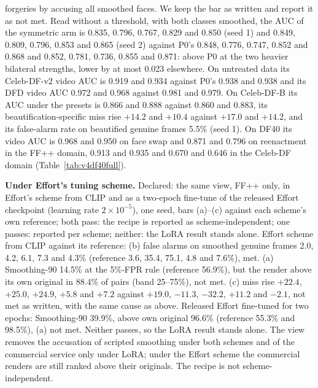 \documentclass[10pt]{article}
\begin{document}
forgeries by accusing all smoothed faces. We keep the bar as written and report it as not met. Read without a
threshold, with both classes smoothed, the AUC of the symmetric arm is 0.835, 0.796, 0.767, 0.829 and 0.850 (seed 1) and
0.849, 0.809, 0.796, 0.853 and 0.865 (seed 2) against P0's 0.848, 0.776, 0.747, 0.852 and 0.868 and 0.852, 0.781, 0.736,
0.855 and 0.871: above P0 at the two heavier bilateral strengths, lower by at most 0.023 elsewhere. On untreated data
its Celeb-DF-v2 video AUC is 0.919 and 0.934 against P0's 0.938 and 0.938 and its DFD video AUC 0.972 and 0.968 against
0.981 and 0.979. On Celeb-DF-B its AUC under the presets is 0.866 and 0.888 against 0.860 and 0.883, its
beautification-specific miss rise $+14.2$ and $+10.4$ against $+17.0$ and $+14.2$, and its false-alarm rate on
beautified genuine frames 5.5\% (seed 1). On DF40 its video AUC is 0.968 and 0.950 on face swap and 0.871 and 0.796 on
reenactment in the FF++ domain, 0.913 and 0.935 and 0.670 and 0.646 in the Celeb-DF domain
(Table~\ref{tab:v4df40full}).

\textbf{Under Effort's tuning scheme.} Declared: the same view, FF++ only, in Effort's scheme from CLIP and as a
two-epoch fine-tune of the released Effort checkpoint (learning rate $2\times10^{-5}$), one seed, bars (a)--(c) against
each scheme's own reference; both pass: the recipe is reported as scheme-independent; one passes: reported per scheme;
neither: the LoRA result stands alone. Effort scheme from CLIP against its reference: (b) false alarms on smoothed
genuine frames 2.0, 4.2, 6.1, 7.3 and 4.3\% (reference 3.6, 35.4, 75.1, 4.8 and 7.6\%), met. (a) Smoothing-90 14.5\% at
the 5\%-FPR rule (reference 56.9\%), but the render above its own original in 88.4\% of pairs (band 25--75\%), not met.
(c) miss rise $+22.4$, $+25.0$, $+24.9$, $+5.8$ and $+7.2$ against $+19.0$, $-11.3$, $-32.2$, $+11.2$ and $-2.1$, not
met as written, with the same cause as above. Released Effort fine-tuned for two epochs: Smoothing-90 39.9\%, above own
original 96.6\% (reference 55.3\% and 98.5\%), (a) not met. Neither passes, so the LoRA result stands alone. The view
removes the accusation of scripted smoothing under both schemes and of the commercial service only under LoRA; under
the Effort scheme the commercial renders are still ranked above their originals. The recipe is not scheme-independent.
\end{document}
